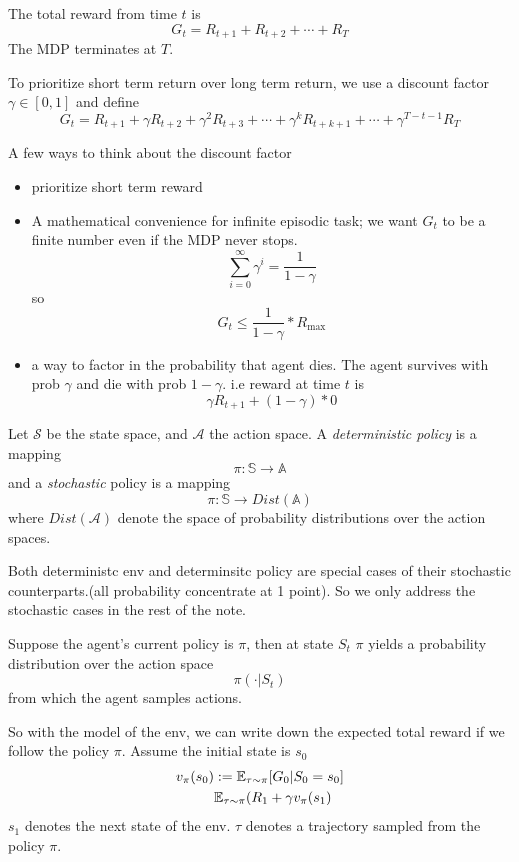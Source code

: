 \documentclass{article}
\begin{document}
The total reward from time $t$ is 
\[
    G_t = R_{t+1} + R_{t+2} + \cdots + R_{T}
\]
The MDP terminates at $T$. 

To prioritize short term return over long term return, we use a 
discount factor $\gamma \in [0, 1]$ and define
\[
    G_t = R_{t+1} + \gamma R_{t+2} + \gamma^2 R_{t+3} + \cdots 
    + \gamma^k R_{t+k+1} + \cdots + \gamma^{T-t-1}R_{T}
\]

A few ways to think about the discount factor
\begin{itemize}
    \item prioritize short term reward
    \item A mathematical convenience for infinite episodic task; we 
        want $G_t$ to be a finite number even if the MDP never stops.
        \[
            \sum_{i=0}^{\infty} \gamma^i = \frac{1}{1-\gamma}
        \]
        so 
        \[
            G_t \le \frac{1}{1-\gamma} * R_{\max}
        \]
    \item a way to factor in the probability that agent dies. The agent 
        survives with prob $\gamma$ and die with prob $1 - \gamma$.
        i.e reward at time $t$ is 
        \[
            \gamma R_{t+1} + (1 - \gamma) * 0
        \]
\end{itemize}

Let $\mathscr{S}$ be the state space, and $\mathscr{A}$ the action space.
A \emph{deterministic policy} is a mapping 
\[
    \pi: \mathbb{S} \rightarrow \mathbb{A}
\]
and a \emph{stochastic} policy is a mapping
\[
    \pi: \mathbb{S} \rightarrow Dist( \mathbb{A} )
\]
where $Dist(\mathscr{ A })$ denote the space of probability distributions
over the action spaces.

Both deterministc env and determinsitc policy are special cases of their
stochastic counterparts.(all probability concentrate at 1 point). So 
we only address the stochastic cases in the rest of the note.

Suppose the agent's current policy is $\pi$, then at state $S_t$
$\pi$ yields a probability distribution over the action space
\[
    \pi(\cdot | S_t)
\]
from which the agent samples actions. 

So with the model of the env, we can write down the expected total 
reward if we follow the policy $\pi$. Assume the initial state is $s_0$
\begin{align*}
    v_{\pi}(s_0) & := \mathbb{E}_{\tau \sim \pi}[G_0 | S_0 = s_0] \\
        & \mathbb{E}_{\tau \sim \pi}(R_1 + \gamma v_{\pi}(s_1) 
\end{align*}
$s_1$ denotes the next state of the env.
$\tau$ denotes a trajectory sampled from the policy $\pi$.
\end{document}
